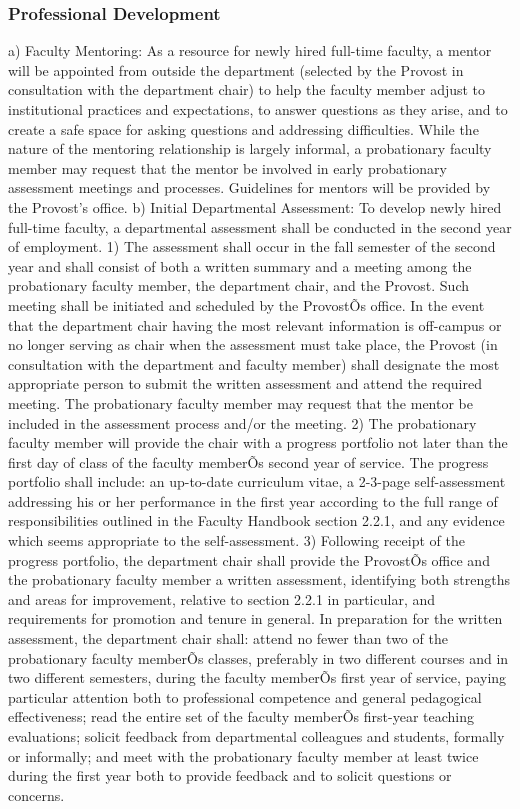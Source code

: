 \documentclass[letterpaper, 11pt]{article}
\begin{document}
		\subsubsection{Professional Development}
			a) Faculty Mentoring:  As a resource for newly hired full-time faculty, a mentor will be appointed from outside the department (selected by the Provost in consultation with the department chair) to help the faculty member adjust to institutional practices and expectations, to answer questions as they arise, and to create a safe space for asking questions and addressing difficulties.  While the nature of the mentoring relationship is largely informal, a probationary faculty member may request that the mentor be involved in early probationary assessment meetings and processes.  Guidelines for mentors will be provided by the Provost's office.
			b) Initial Departmental Assessment:  To develop newly hired full-time faculty, a departmental assessment shall be conducted in the second year of employment.
			1) The assessment shall occur in the fall semester of the second year and shall consist of both a written summary and a meeting among the probationary faculty member, the department chair, and the Provost.  Such meeting shall be initiated and scheduled by the ProvostÕs office.  In the event that the department chair having the most relevant information is off-campus or no longer serving as chair when the assessment must take place, the Provost (in consultation with the department and faculty member) shall designate the most appropriate person to submit the written assessment and attend the required meeting.  The probationary faculty member may request that the mentor be included in the assessment process and/or the meeting.
			2) The probationary faculty member will provide the chair with a progress portfolio not later than the first day of class of the faculty memberÕs second year of service. The progress portfolio shall include:  an up-to-date curriculum vitae, a 2-3-page self-assessment addressing his or her performance in the first year according to the full range of responsibilities outlined in the Faculty Handbook section 2.2.1, and any evidence which seems appropriate to the self-assessment.
			3) Following receipt of the progress portfolio, the department chair shall provide the ProvostÕs office and the probationary faculty member a written assessment, identifying both strengths and areas for improvement, relative to section 2.2.1 in particular, and requirements for promotion and tenure in general.  In preparation for the written assessment, the department chair shall:  attend no fewer than two of the probationary faculty memberÕs classes, preferably in two different courses and in two different semesters, during the faculty memberÕs first year of service, paying particular attention both to professional competence and general pedagogical effectiveness; read the entire set of the faculty memberÕs first-year teaching evaluations; solicit feedback from departmental colleagues and students, formally or informally; and meet with the probationary faculty member at least twice during the first year both to provide feedback and to solicit questions or concerns.
\end{document}
